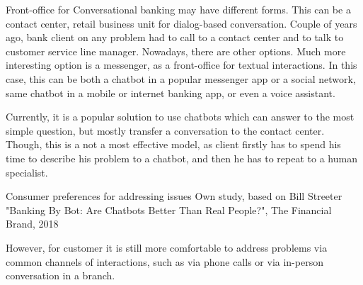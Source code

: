 Front-office for Conversational banking may have different forms.
This can be a contact center, retail business unit for dialog-based conversation.
Couple of years ago, bank client on any problem had to call to a contact center and to talk to customer service line manager. 
\cite{trillion_opportunity}
Nowadays, there are other options.
Much more interesting option is a messenger, as a front-office for textual interactions.
In this case, this can be both a chatbot in a popular messenger app or a social network, same chatbot in a mobile or internet banking app, or even a voice assistant.

Currently, it is a popular solution to use chatbots which can answer to the most simple question, but mostly transfer a conversation to the contact center.
Though, this is a not a most effective model, as client firstly has to spend his time to describe his problem to a chatbot, and then he has to repeat to a human specialist.
\cite{accenture_conversational_banking}

\mttable
{Consumer preferences for addressing issues}
{Own study, based on Bill Streeter "Banking By Bot: Are Chatbots Better Than Real People?", The \allowbreak Financial Brand, 2018}
{
}
    
However, for customer it is still more comfortable to address problems via common channels of interactions, such as via phone calls or via in-person conversation in a branch.
\cite{humley_banking_report}

